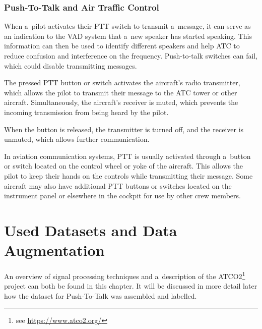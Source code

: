 \newpage    
\subsection{Push-To-Talk and Air Traffic Control}\label{PTTinATC}

When a~pilot activates their PTT switch to transmit a~message, it can serve as an indication to the VAD system that a~new speaker has started speaking. This information can then be used to identify different speakers and help ATC to reduce confusion and interference on the frequency. Push-to-talk switches can fail, which could disable transmitting messages.

The pressed PTT button or switch activates the aircraft's radio transmitter, which allows the pilot to transmit their message to the ATC tower or other aircraft. Simultaneously, the aircraft's receiver is muted, which prevents the incoming transmission from being heard by the pilot. 

When the button is released, the transmitter is turned off, and the receiver is unmuted, which allows further communication. 


In aviation communication systems, PTT is usually activated through a~button or switch located on the control wheel or yoke of the aircraft. This allows the pilot to keep their hands on the controls while transmitting their message. Some aircraft may also have additional PTT buttons or switches located on the instrument panel or elsewhere in the cockpit for use by other crew members.






\chapter{Used Datasets and Data Augmentation}\label{Data}

    An overview of signal processing techniques and a~description of the ATCO2\footnote{see \href{https://www.atco2.org/}{{\selectfont https://www.atco2.org/}}} project can both be found in this chapter. It will be discussed in more detail later how the dataset for Push-To-Talk was assembled and labelled. 

